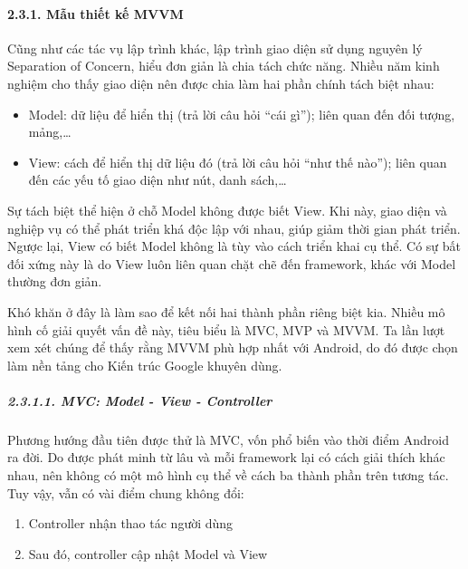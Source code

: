 \documentclass[
]{article}
\providecommand{\tightlist}{%
  \setlength{\itemsep}{0pt}\setlength{\parskip}{0pt}}
\begin{document}
\hypertarget{mux1eabu-thiux1ebft-kux1ebf-mvvm}{%
\paragraph{\texorpdfstring{2.3.1. Mẫu thiết kế MVVM
}{2.3.1. Mẫu thiết kế MVVM }}\label{mux1eabu-thiux1ebft-kux1ebf-mvvm}}

Cũng như các tác vụ lập trình khác, lập trình giao diện sử dụng nguyên
lý Separation of Concern, hiểu đơn giản là chia tách chức năng. Nhiều
năm kinh nghiệm cho thấy giao diện nên được chia làm hai phần chính tách
biệt nhau:

\begin{itemize}
\tightlist
\item
  Model: dữ liệu để hiển thị (trả lời câu hỏi ``cái gì''); liên quan đến
  đối tượng, mảng,\ldots{}
\item
  View: cách để hiển thị dữ liệu đó (trả lời câu hỏi ``như thế nào'');
  liên quan đến các yếu tố giao diện như nút, danh sách,\ldots{}
\end{itemize}

Sự tách biệt thể hiện ở chỗ Model không được biết View. Khi này, giao
diện và nghiệp vụ có thể phát triển khá độc lập với nhau, giúp giảm thời
gian phát triển. Ngược lại, View có biết Model không là tùy vào cách
triển khai cụ thể. Có sự bất đối xứng này là do View luôn liên quan chặt
chẽ đến framework, khác với Model thường đơn giản.

Khó khăn ở đây là làm sao để kết nối hai thành phần riêng biệt kia.
Nhiều mô hình cố giải quyết vấn đề này, tiêu biểu là MVC, MVP và MVVM.
Ta lần lượt xem xét chúng để thấy rằng MVVM phù hợp nhất với Android, do
đó được chọn làm nền tảng cho Kiến trúc Google khuyên dùng.

\hypertarget{mvc-model---view---controller}{%
\subparagraph{2.3.1.1. MVC: Model - View -
Controller}\label{mvc-model---view---controller}}

Phương hướng đầu tiên được thử là MVC, vốn phổ biến vào thời điểm
Android ra đời. Do được phát minh từ lâu và mỗi framework lại có cách
giải thích khác nhau, nên không có một mô hình cụ thể về cách ba thành
phần trên tương tác. Tuy vậy, vẫn có vài điểm chung không đổi:

\begin{enumerate}
\def\labelenumi{\arabic{enumi}.}
\tightlist
\item
  Controller nhận thao tác người dùng
\item
  Sau đó, controller cập nhật Model và View
\end{enumerate}
\end{document}
